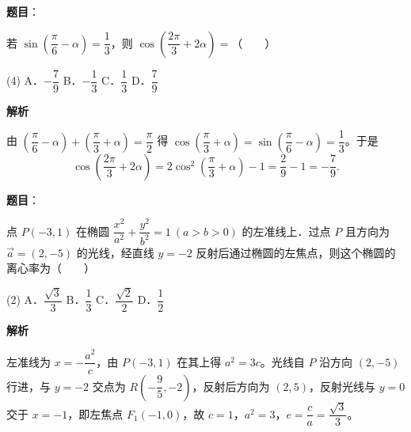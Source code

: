\begin{answer}

\textbf{题目}：

若 $\sin\left(\dfrac{\pi}{6} - \alpha\right) = \dfrac{1}{3}$，则 $\cos\left(\dfrac{2\pi}{3} + 2\alpha\right) =$\mbox{（　　）}

\begin{gkopts}(4)
\task A．$-\dfrac{7}{9}$
\task B．$-\dfrac{1}{3}$
\task C．$\dfrac{1}{3}$
\task D．$\dfrac{7}{9}$
\end{gkopts}

\textbf{解析}

由 $\left(\dfrac{\pi}{6} - \alpha\right) + \left(\dfrac{\pi}{3} + \alpha\right) = \dfrac{\pi}{2}$ 得 $\cos\left(\dfrac{\pi}{3} + \alpha\right) = \sin\left(\dfrac{\pi}{6} - \alpha\right) = \dfrac{1}{3}$。于是
\nopagebreak[4]
\[
\cos\left(\frac{2\pi}{3} + 2\alpha\right) = 2\cos^2\left(\frac{\pi}{3} + \alpha\right) - 1 = \frac{2}{9} - 1 = -\frac{7}{9}.
\]


\end{answer}
\begin{answer}

\textbf{题目}：

点 $P(-3, 1)$ 在椭圆 $\dfrac{x^2}{a^2} + \dfrac{y^2}{b^2} = 1\ (a > b > 0)$ 的左准线上．过点 $P$ 且方向为 $\vec{a} = (2, -5)$ 的光线，经直线 $y = -2$ 反射后通过椭圆的左焦点，则这个椭圆的离心率为\mbox{（　　）}

\begin{gkopts}(2)
\task A．$\dfrac{\sqrt{3}}{3}$
\task B．$\dfrac{1}{3}$
\task C．$\dfrac{\sqrt{2}}{2}$
\task D．$\dfrac{1}{2}$
\end{gkopts}

\textbf{解析}

左准线为 $x = -\dfrac{a^2}{c}$，由 $P(-3, 1)$ 在其上得 $a^2 = 3c$。光线自 $P$ 沿方向 $(2, -5)$ 行进，与 $y = -2$ 交点为 $R\!\left(-\dfrac{9}{5}, -2\right)$，反射后方向为 $(2, 5)$，反射光线与 $y = 0$ 交于 $x = -1$，即左焦点 $F_1(-1, 0)$，故 $c = 1$，$a^2 = 3$，$e = \dfrac{c}{a} = \dfrac{\sqrt{3}}{3}$。


\end{answer}
